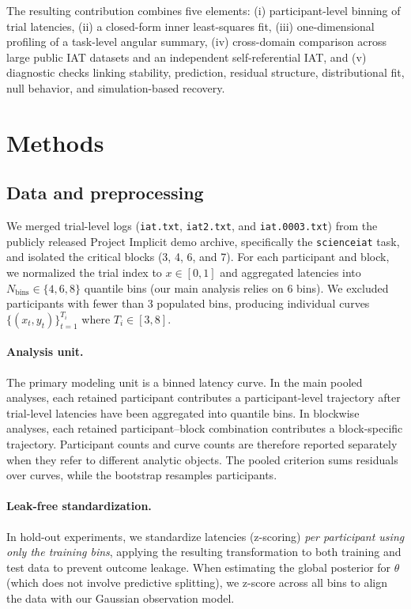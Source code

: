 \documentclass[12pt]{article}
\begin{document}
The resulting contribution combines five elements: (i) participant-level binning of trial latencies, (ii) a closed-form inner least-squares fit, (iii) one-dimensional profiling of a task-level angular summary, (iv) cross-domain comparison across large public IAT datasets and an independent self-referential IAT, and (v) diagnostic checks linking stability, prediction, residual structure, distributional fit, null behavior, and simulation-based recovery.

\section{Methods}

\subsection{Data and preprocessing}
We merged trial-level logs (\texttt{iat.txt}, \texttt{iat2.txt}, and \texttt{iat.0003.txt}) from the publicly released Project Implicit demo archive, specifically the \texttt{scienceiat} task, and isolated the critical blocks (3, 4, 6, and 7). For each participant and block, we normalized the trial index to $x\in[0,1]$ and aggregated latencies into $N_{\text{bins}}\in\{4,6,8\}$ quantile bins (our main analysis relies on $6$ bins). We excluded participants with fewer than 3 populated bins, producing individual curves $\{(x_t,y_t)\}_{t=1}^{T_i}$ where $T_i\in[3,8]$.

\paragraph{Analysis unit.}
The primary modeling unit is a binned latency curve. In the main pooled analyses, each retained participant contributes a participant-level trajectory after trial-level latencies have been aggregated into quantile bins. In blockwise analyses, each retained participant--block combination contributes a block-specific trajectory. Participant counts and curve counts are therefore reported separately when they refer to different analytic objects. The pooled criterion sums residuals over curves, while the bootstrap resamples participants.

\paragraph{Leak-free standardization.}
In hold-out experiments, we standardize latencies (z-scoring) \emph{per participant using only the training bins}, applying the resulting transformation to both training and test data to prevent outcome leakage. When estimating the global posterior for $\theta$ (which does not involve predictive splitting), we z-score across all bins to align the data with our Gaussian observation model.
\end{document}
